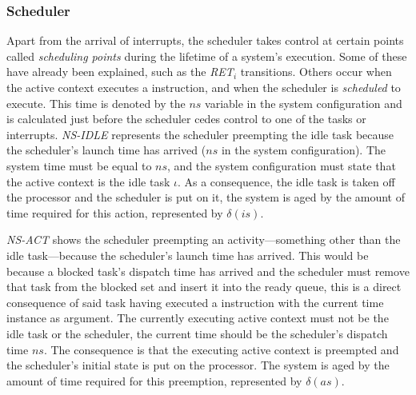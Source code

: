 \subsubsection{Scheduler}
Apart from the arrival of interrupts, the scheduler takes control at
certain points called \emph{scheduling points} during the lifetime of
a system's execution. Some of these have already been explained, such
as the \emph{RET$_i$} transitions. Others occur when the active
context executes a  instruction, and when the
scheduler is \emph{scheduled} to execute. This time is denoted by the
$ns$ variable in the system configuration and is calculated just
before the scheduler cedes control to one of the tasks or
interrupts. \emph{NS-IDLE} represents the scheduler preempting the
idle task because the scheduler's launch time has arrived ($ns$ in the
system configuration). The system time must be equal to $ns$, and the
system configuration must state that the active context is the idle
task $\iota$. As a consequence, the idle task is taken off the
processor and the scheduler is put on it, the system is aged by the
amount of time required for this action, represented by $\delta(is)$.


\emph{NS-ACT} shows the scheduler preempting an activity---something
other than the idle task---because the scheduler's launch time has
arrived. This would be because a blocked task's dispatch time has
arrived and the scheduler must remove that task from the blocked set
and insert it into the ready queue, this is a direct consequence of
said task having executed a  instruction with the
current time instance as argument. The currently executing active
context must not be the idle task or the scheduler, the current time
should be the scheduler's dispatch time $ns$. The consequence is that
the executing active context is preempted and the scheduler's initial
state is put on the processor. The system is aged by the amount of
time required for this preemption, represented by $\delta(as)$.

%
%

